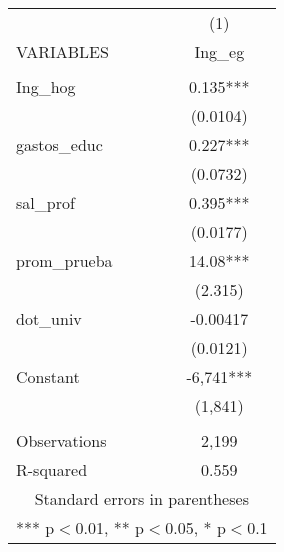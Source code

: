 \documentclass[]{article}
\begin{document}
\begin{tabular}{lc} \hline
 & (1) \\
VARIABLES & Ing\_eg \\ \hline
 &  \\
Ing\_hog & 0.135*** \\
 & (0.0104) \\
gastos\_educ & 0.227*** \\
 & (0.0732) \\
sal\_prof & 0.395*** \\
 & (0.0177) \\
prom\_prueba & 14.08*** \\
 & (2.315) \\
dot\_univ & -0.00417 \\
 & (0.0121) \\
Constant & -6,741*** \\
 & (1,841) \\
 &  \\
Observations & 2,199 \\
 R-squared & 0.559 \\ \hline
\multicolumn{2}{c}{ Standard errors in parentheses} \\
\multicolumn{2}{c}{ *** p$<$0.01, ** p$<$0.05, * p$<$0.1} \\
\end{tabular}
\end{document}

